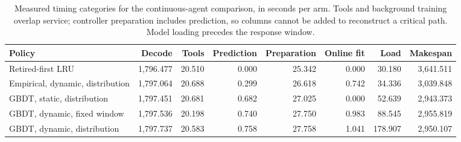 \begin{table}[t]
\centering\small
\caption{Measured timing categories for the continuous-agent comparison, in seconds per arm. Tools and background training overlap service; controller preparation includes prediction, so columns cannot be added to reconstruct a critical path. Model loading precedes the response window.}
\label{tab:continuous-overhead}
\setlength{\tabcolsep}{4pt}
\begin{tabular}{@{}lrrrrrrr@{}}
\toprule
Policy & Decode & Tools & Prediction & Preparation & Online fit & Load & Makespan \\
\midrule
Retired-first LRU & 1,796.477 & 20.510 & 0.000 & 25.342 & 0.000 & 30.180 & 3,641.511 \\
Empirical, dynamic, distribution & 1,797.064 & 20.688 & 0.299 & 26.618 & 0.742 & 34.336 & 3,039.848 \\
GBDT, static, distribution & 1,797.451 & 20.681 & 0.682 & 27.025 & 0.000 & 52.639 & 2,943.373 \\
GBDT, dynamic, fixed window & 1,797.536 & 20.198 & 0.740 & 27.750 & 0.983 & 88.545 & 2,955.819 \\
GBDT, dynamic, distribution & 1,797.737 & 20.583 & 0.758 & 27.758 & 1.041 & 178.907 & 2,950.107 \\
\bottomrule
\end{tabular}
\end{table}
